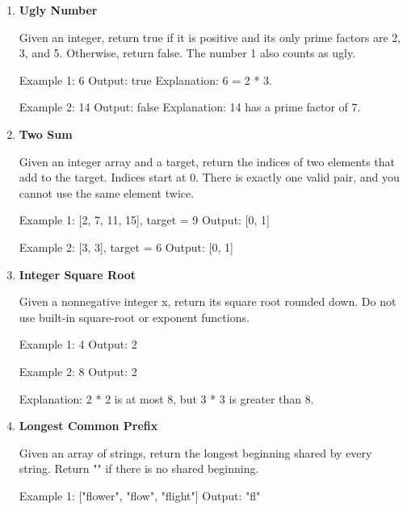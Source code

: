 \begin{enumerate}
\item \textbf{Ugly Number}

Given an integer, return true if it is positive and its only prime factors are 2, 3, and 5. Otherwise, return false. The number 1 also counts as ugly.


\begin{console}
Example 1: 6
Output:    true
Explanation: 6 = 2 * 3.

Example 2: 14
Output:    false
Explanation: 14 has a prime factor of 7.
\end{console}\newpage


\item \textbf{Two Sum}

Given an integer array and a target, return the indices of two elements that add to the target. Indices start at 0. There is exactly one valid pair, and you cannot use the same element twice.

\begin{console}
Example 1: [2, 7, 11, 15], target = 9
Output:    [0, 1]

Example 2: [3, 3], target = 6
Output:    [0, 1]
\end{console}\newpage


\item \textbf{Integer Square Root}

Given a nonnegative integer x, return its square root rounded down. Do not use built-in square-root or exponent functions.

\begin{console}
Example 1: 4
Output:    2

Example 2: 8
Output:    2

Explanation: 2 * 2 is at most 8, but 3 * 3 is greater than 8.
\end{console}\newpage


\item \textbf{Longest Common Prefix}

Given an array of strings, return the longest beginning shared by every string. Return "" if there is no shared beginning.

\begin{console}
Example 1: ["flower", "flow", "flight"]
Output:    "fl"


\end{console}
\end{enumerate}

